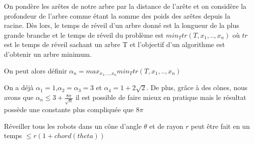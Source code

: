 On pondère les arêtes de notre arbre par la distance de l'arête et on considère la profondeur de l'arbre comme étant la somme des poids des arêtes depuis la racine. Dès lors, le temps de réveil d'un arbre donné est la longueur de la plus grande branche et le temps de réveil du problème est $min_{T} tr(T, x_1, .., x_n)$ où $tr$ est le temps de réveil sachant un arbre T et l'objectif d'un algorithme est d'obtenir un arbre minimum.

On peut alors définir $\alpha_n = max_{x_1, .., x_n} min_T tr(T, x_1, .., x_n)$

On a déjà $\alpha_1 = 1$,$\alpha_2 = \alpha_3 = 3$ et $\alpha_4 = 1 + 2\sqrt{2}$. De plus, grâce à des cônes, nous avons que $\alpha_n \leq 3 + \frac{8\pi}{\sqrt{n}}$ il est possible de faire mieux en pratique mais le résultat possède une constante plus compliquée que $8\pi$

\begin{theorem}
	Réveiller tous les robots dans un cône d'angle $\theta$ et de rayon $r$ peut être fait en un temps $\leq r(1 + chord(theta))$
\end{theorem}